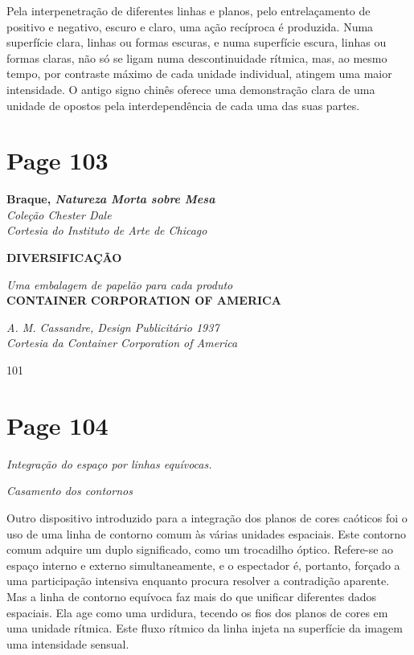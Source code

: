 \documentclass[a4paper]{article}
\begin{document}
Pela interpenetração de diferentes linhas e planos, pelo entrelaçamento de positivo e negativo, escuro e claro, uma ação recíproca é produzida. Numa superfície clara, linhas ou formas escuras, e numa superfície escura, linhas ou formas claras, não só se ligam numa descontinuidade rítmica, mas, ao mesmo tempo, por contraste máximo de cada unidade individual, atingem uma maior intensidade. O antigo signo chinês oferece uma demonstração clara de uma unidade de opostos pela interdependência de cada uma das suas partes.

\vspace*{\fill}

\newpage
\section*{Page 103}

\noindent
\textbf{Braque, \textit{Natureza Morta sobre Mesa}} \\
\textit{Coleção Chester Dale} \\
\textit{Cortesia do Instituto de Arte de Chicago}

\bigskip

\noindent
\textbf{\Large DIVERSIFICAÇÃO}

\noindent
\textit{Uma embalagem de papelão para cada produto} \\
\textbf{CONTAINER CORPORATION OF AMERICA}

\bigskip

\noindent
\textit{A. M. Cassandre, Design Publicitário 1937} \\
\textit{Cortesia da Container Corporation of America}

\bigskip

\begin{center}
101
\end{center}

\newpage
\section*{Page 104}

\noindent\textit{Integração do espaço por linhas equívocas.}

\noindent\textit{Casamento dos contornos}

\bigskip

Outro dispositivo introduzido para a integração dos planos de cores caóticos foi o uso de uma linha de contorno comum às várias unidades espaciais. Este contorno comum adquire um duplo significado, como um trocadilho óptico. Refere-se ao espaço interno e externo simultaneamente, e o espectador é, portanto, forçado a uma participação intensiva enquanto procura resolver a contradição aparente. Mas a linha de contorno equívoca faz mais do que unificar diferentes dados espaciais. Ela age como uma urdidura, tecendo os fios dos planos de cores em uma unidade rítmica. Este fluxo rítmico da linha injeta na superfície da imagem uma intensidade sensual.
\end{document}
